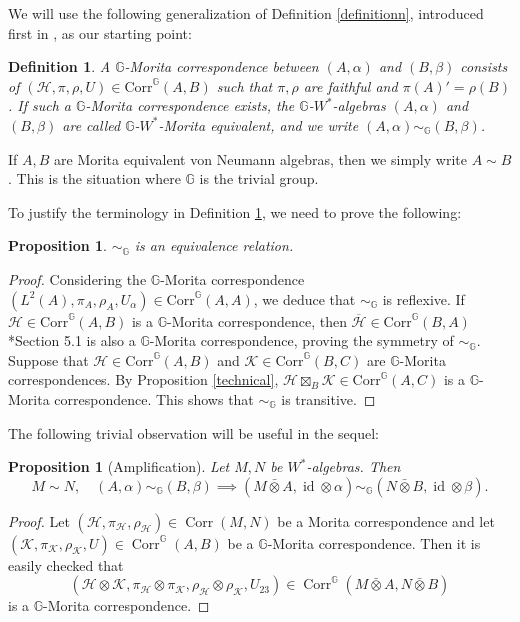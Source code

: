 \documentclass[reqno]{amsart}
\numberwithin{equation}{section}
\newtheorem{Def}[Theorem]{Definition}
\newtheorem{Prop}[Theorem]{Proposition}
\DeclareMathOperator{\id}{\mathrm{id}}
\newcommand{\G}{\mathbb{G}}
\newcommand{\Corr}{\mathrm{Corr}}
\newcommand{\ovot}{\bar{\otimes}}
\begin{document}
We will use the following generalization of Definition \ref{definitionn}, introduced first in \cite{DCDR24a}, as our starting point:
\begin{Def}\label{definition Morita}
 A $\G$-Morita correspondence between $(A, \alpha)$ and $(B, \beta)$ consists of $(\mathcal{H}, \pi, \rho, U)\in \Corr^\G(A,B)$ such that $\pi, \rho$ are faithful and $\pi(A)'= \rho(B)$.
    If such a $\G$-Morita correspondence exists, the $\G$-$W^*$-algebras $(A, \alpha)$ and $(B, \beta)$ are called $\G$-$W^*$-Morita equivalent, and we write $(A, \alpha)\sim_\G (B, \beta)$.
\end{Def}

If $A,B$ are Morita equivalent von Neumann algebras, then we simply write $A\sim B$. This is the situation where $\G$ is the trivial group. 

To justify the terminology in Definition \ref{definition Morita}, we need to prove the following:

\begin{Prop}
    $\sim_\G$ is an equivalence relation.
\end{Prop}
\begin{proof} Considering the $\G$-Morita correspondence $(L^2(A), \pi_A, \rho_A, U_\alpha)\in \Corr^\G(A,A)$, we deduce that $\sim_\G$ is reflexive. If $\mathcal{H} \in \Corr^\G(A,B)$ is a $\G$-Morita correspondence, then $\overline{\mathcal{H}}\in \Corr^\G(B,A)$ \cite{DCDR24a}*{Section 5.1} is also a $\G$-Morita correspondence, proving the symmetry of $\sim_\G$. Suppose that $\mathcal{H}\in \Corr^\G(A,B)$ and $\mathcal{K}\in \Corr^\G(B,C)$ are $\G$-Morita correspondences. By Proposition \ref{technical}, 
$\mathcal{H}\boxtimes_B \mathcal{K} \in \Corr^\G(A,C)$ is a $\G$-Morita correspondence. This shows that $\sim_\G$ is transitive.
\end{proof}

The following trivial observation will be useful in the sequel:

\begin{Prop}[Amplification]\label{amplification} Let $M,N$ be $W^*$-algebras. Then
$$M\sim N, \quad (A, \alpha)\sim_\G (B, \beta)\implies (M\ovot A, \id \otimes \alpha)\sim_\G (N \ovot B, \id \otimes \beta).$$
\end{Prop}
\begin{proof}
    Let $(\mathcal{H},\pi_\mathcal{H}, \rho_\mathcal{H}) \in \operatorname{Corr}(M,N)$ be a Morita correspondence and let $(\mathcal{K}, \pi_\mathcal{K}, \rho_\mathcal{K}, U) \in \operatorname{Corr}^\G(A ,B)$ be a $\G$-Morita correspondence. Then it is easily checked that
    $$(\mathcal{H}\otimes \mathcal{K}, \pi_\mathcal{H}\otimes \pi_\mathcal{K}, \rho_\mathcal{H}\otimes \rho_\mathcal{K}, U_{23})\in \operatorname{Corr}^\G(M\ovot A ,N \ovot B)$$
    is a $\G$-Morita correspondence.
\end{proof}
\end{document}
